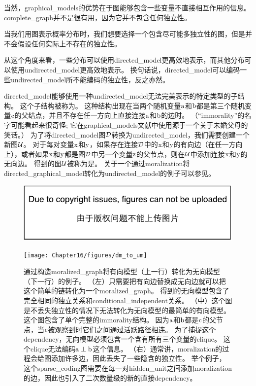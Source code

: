 当然，\gls{graphical_models}的优势在于图能够包含一些变量不直接相互作用的信息。 
\gls{complete_graph}并不是很有用，因为它并不包含任何独立性。


当我们用图表示概率分布时，我们想要选择一个包含尽可能多独立性的图，但是并不会假设任何实际上不存在的独立性。


从这个角度来看，一些分布可以使用\gls{directed_model}更高效地表示，而其他分布可以使用\gls{undirected_model}更高效地表示。
换句话说，\gls{directed_model}可以编码一些\gls{undirected_model}所不能编码的独立性，反之亦然。


\gls{directed_model}能够使用一种\gls{undirected_model}无法完美表示的特定类型的子结构。
这个子结构被称为。
这种结构出现在当两个随机变量$\mathrm{a}$和$\mathrm{b}$都是第三个随机变量$\mathrm{c}$的父结点，并且不存在任一方向上直接连接$\mathrm{a}$和$\mathrm{b}$的边时。
（``\gls{immorality}''的名字可能看起来很奇怪; 它在\gls{graphical_models}文献中使用源于一个关于未婚父母的笑话。）
为了将\gls{directed_model}图$\mathcal{D}$转换为\gls{undirected_model}，我们需要创建一个新图$\mathcal{U}$。
对于每对变量$\mathrm{x}$和$\mathrm{y}$，如果存在连接$\mathcal{D}$中的$\mathrm{x}$和$\mathrm{y}$的有向边（在任一方向上），或者如果$\mathrm{x}$和$\mathrm{y}$都是图$\mathcal{D}$中另一个变量$\mathrm{z}$的父节点，则在$\mathcal{U}$中添加连接$\mathrm{x}$和$\mathrm{y}$的无向边。 
得到的图$\mathcal{U}$被称为是。
关于一个通过\gls{moralization}将\gls{directed_graphical_model}转化为\gls{undirected_model}的例子可以参见。


\begin{figure}[!htb]
\ifOpenSource
\centerline{\includegraphics{figure.pdf}}
\else
	\centerline{\texttt{[image: Chapter16/figures/dm\_to\_um]}}	
\fi
\caption{通过构造\gls{moralized_graph}将有向模型（上一行）转化为无向模型（下一行）的例子。
（左）只需要把有向边替换成无向边就可以把这个简单的链转化为一个\gls{moralized_graph}。
得到的无向模型包含了完全相同的独立关系和\gls{conditional_independent}关系。
（中）这个图是不丢失独立性的情况下无法转化为无向模型的最简单的有向模型。
这个图包含了单个完整的\gls{immorality}结构。
因为$\mathrm{a}$和$\mathrm{b}$都是$\mathrm{c}$的父节点，当$\mathrm{c}$被观察到时它们之间通过活跃路径相连。
为了捕捉这个\gls{dependency}，无向模型必须包含一个含有所有三个变量的\gls{clique}。
这个\gls{clique}无法编码$\mathrm{a} \perp \mathrm{b}$这个信息。
（右）通常讲，\gls{moralization}的过程会给图添加许多边，因此丢失了一些隐含的独立性。
举个例子，这个\gls{sparse_coding}图需要在每一对\gls{hidden_unit}之间添加\gls{moralization}的边，因此也引入了二次数量级的新的直接\gls{dependency}。}
	\label{fig:dm_to_um}
\end{figure}



